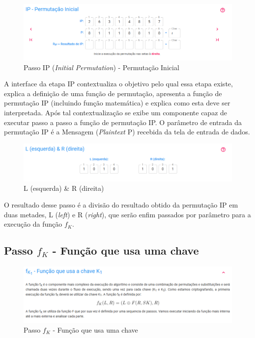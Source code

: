 \begin{figure}[H]
    \centering
    \caption{Passo IP (\textit{Initial Permutation}) - Permutação Inicial}
    \includegraphics[width=1\linewidth]{UI/UIIP.png}
\end{figure}

A interface da etapa IP contextualiza o objetivo pelo qual essa etapa existe, explica a definição de uma função de permutação, apresenta a função de permutação IP (incluindo função matemática) e explica como esta deve ser interpretada. Após tal contextualização se exibe um componente capaz de executar passo a passo a função de permutação IP. O parâmetro de entrada da permutação IP é a Mensagem (\textit{Plaintext} P) recebida da tela de entrada de dados.

\begin{figure}[H]
    \centering
    \caption{L (esquerda) \& R (direita)}
    \includegraphics[width=1\linewidth]{UI/UILR.png}
\end{figure}

O resultado desse passo é a divisão do resultado obtido da permutação IP em duas metades, L (\textit{left}) e R (\textit{right}), que serão enfim passados por parâmetro para a execução da função \(f_K\).

\subsection{Passo \(f_K\) - Função que usa uma chave}

\begin{figure}[H]
    \centering
    \caption{Passo \(f_K\) - Função que usa uma chave}
    \includegraphics[width=1\linewidth]{UI/UIFK1.png}
\end{figure}

